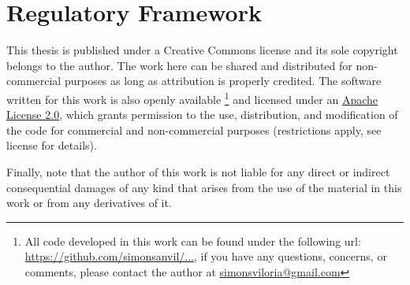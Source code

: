 \documentclass[../main.tex]{subfiles}
\begin{document}
\chapter*{Regulatory Framework} \label{chap:regulatory_framework}

This thesis is published under a Creative Commons license and its sole copyright belongs to the author. The work here can be shared and distributed for non-commercial purposes as long as attribution is properly credited. 
The software written for this work is also openly available
\footnote{All code developed in this work can be found under the following url: \href{}{https://github.com/simonsanvil/...}, if you have any questions, concerns, or comments, please contact the author at \href{mailto:simonsviloria@gmail.com}{simonsviloria@gmail.com}
} 
and licensed under an \href{https://en.wikipedia.org/wiki/Apache_License}{Apache License 2.0}, which grants permission to the use, distribution, and modification of the code for commercial and non-commercial purposes (restrictions apply, see license for details). \\


Finally, note that the author of this work is not liable for any direct or indirect consequential damages of any kind that arises from the use of the material in this work or from any derivatives of it.


\end{document}
